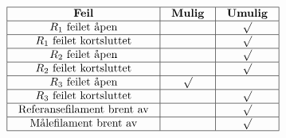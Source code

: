 $$\vbox{\offinterlineskip
\halign{\strut
\vrule \quad\hfil # \ \hfil & 
\vrule \quad\hfil # \ \hfil & 
\vrule \quad\hfil # \ \hfil \vrule \cr
\noalign{\hrule}
%
{\bf Feil} & {\bf Mulig} & {\bf Umulig} \cr
%
\noalign{\hrule}
%
$R_1$ feilet åpen &  & $\surd$ \cr
%
\noalign{\hrule}
%
$R_1$ feilet kortsluttet &  & $\surd$ \cr
%
\noalign{\hrule}
%
$R_2$ feilet åpen &  & $\surd$ \cr
%
\noalign{\hrule}
%
$R_2$ feilet kortsluttet &  & $\surd$ \cr
%
\noalign{\hrule}
%
$R_3$ feilet åpen & $\surd$ &  \cr
%
\noalign{\hrule}
%
$R_3$ feilet kortsluttet &  & $\surd$ \cr
%
\noalign{\hrule}
%
Referansefilament brent av &  & $\surd$ \cr
%
\noalign{\hrule}
%
Målefilament brent av &  & $\surd$ \cr
%
\noalign{\hrule}
} %
}$$ %









